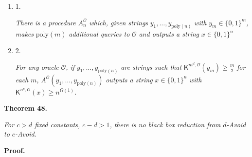 \documentclass[10pt,a4paper]{article}
\begin{document}
\begin{enumerate}


\item[] 
1. 


\emph{There is a procedure }$A^{\mathcal{O}}_{n}$\emph{ which, given strings }$y_{1},\ldots,y_{\mathrm{poly}(n)}$\emph{ with }$y_{m}\in\{0,1\}^{m}$\emph{, makes }$\mathrm{poly}(m)$\emph{ additional queries to }$\mathcal{O}$\emph{ and outputs a string }$x\in\{0,1\}^{n}$\emph{}\par





\item[] 
2. 


\emph{For any oracle }$\mathcal{O}$\emph{, if }$y_{1},\ldots,y_{\mathrm{poly}(n)}$\emph{ are strings such that }${\mathsf{K}}^{m^{d},\mathcal{O}}(y_{m})\geq\frac{m}{2}$\emph{ for each }$m$\emph{, }$A^{\mathcal{O}}(y_{1},\ldots,y_{\mathrm{poly}(n)})$\emph{ outputs a string }$x\in\{0,1\}^{n}$\emph{ with }${\mathsf{K}}^{n^{c},\mathcal{O}}(x)\geq n^{\Omega(1)}$\emph{.}\par





\end{enumerate}








\par\medskip\noindent\textbf{
\textbf{Theorem 48}\textbf{.}
}\par



\emph{For $c>d$ fixed constants, $c-d>1$, there is no black box reduction from $d$-Avoid to $c$-Avoid.}\par







\par\medskip\noindent\textbf{Proof.}\par
\end{document}
